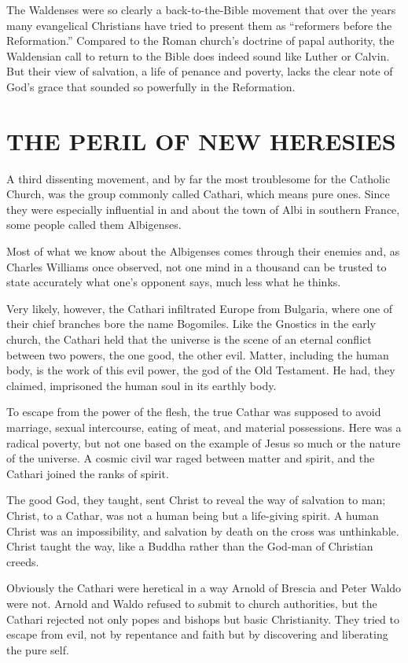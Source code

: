 The Waldenses were so clearly a back-to-the-Bible movement that over the years many evangelical
Christians have tried to present them as “reformers before the Reformation.” Compared to the Roman
church’s doctrine of papal authority, the Waldensian call to return to the Bible does indeed sound
like Luther or Calvin. But their view of salvation, a life of penance and poverty, lacks the clear
note of God’s grace that sounded so powerfully in the Reformation.

\section{THE PERIL OF NEW HERESIES}

A third dissenting movement, and by far the most troublesome for the Catholic Church, was the group
commonly called Cathari, which means pure ones. Since they were especially influential in and about
the town of Albi in southern France, some people called them Albigenses.

Most of what we know about the Albigenses comes through their enemies and, as Charles Williams once
observed, not one mind in a thousand can be trusted to state accurately what one’s opponent says,
much less what he thinks.

Very likely, however, the Cathari infiltrated Europe from Bulgaria, where one of their chief
branches bore the name Bogomiles. Like the Gnostics in the early church, the Cathari held that the
universe is the scene of an eternal conflict between two powers, the one good, the other evil.
Matter, including the human body, is the work of this evil power, the god of the Old Testament. He
had, they claimed, imprisoned the human soul in its earthly body.

To escape from the power of the flesh, the true Cathar was supposed to avoid marriage, sexual
intercourse, eating of meat, and material possessions. Here was a radical poverty, but not one based
on the example of Jesus so much or the nature of the universe. A cosmic civil war raged between
matter and spirit, and the Cathari joined the ranks of spirit.

The good God, they taught, sent Christ to reveal the way of salvation to man; Christ, to a Cathar,
was not a human being but a life-giving spirit. A human Christ was an impossibility, and salvation
by death on the cross was unthinkable. Christ taught the way, like a Buddha rather than the God-man
of Christian creeds.

Obviously the Cathari were heretical in a way Arnold of Brescia and Peter Waldo were not. Arnold and
Waldo refused to submit to church authorities, but the Cathari rejected not only popes and bishops
but basic Christianity. They tried to escape from evil, not by repentance and faith but by
discovering and liberating the pure self.

